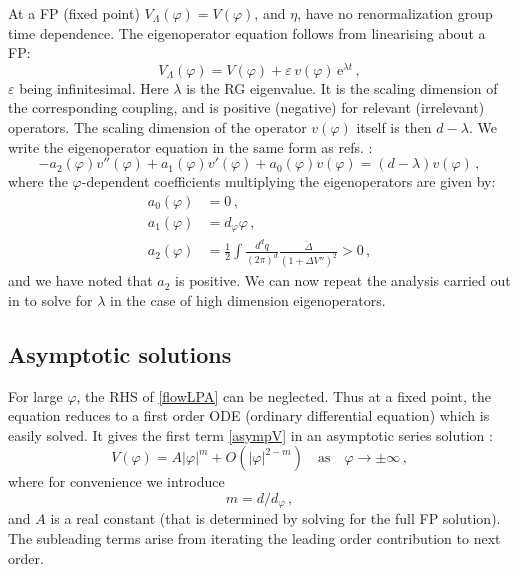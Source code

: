 \documentclass[11pt,a4paper]{article}
\numberwithin{figure}{section}
\numberwithin{equation}{section}
\newcommand{\be}{\begin{equation}}
\newcommand{\ee}{\end{equation}}
\newcommand{\ph}{\varphi}
\newcommand{\e}{\text{e}}
\begin{document}
At a FP (fixed point) $V_\Lambda (\varphi)=V(\varphi)$, and $\eta$, have no renormalization group time dependence. The eigenoperator equation follows from linearising about a FP:
\begin{equation}
    V_\Lambda(\varphi)= V(\ph)+\varepsilon\, v(\ph) \,\e^{\lambda t} \,,
\end{equation}
$\varepsilon$ being infinitesimal. Here $\lambda$ is the RG eigenvalue.  It is the scaling dimension of the corresponding coupling, and is positive (negative) for relevant (irrelevant) operators. The scaling dimension of the operator $v(\ph)$ itself is then $d-\lambda$. We write the eigenoperator equation in the same form as refs. \cite{Benedetti:2013jk,Mitchell:2021qjr,Morris:2022btf}:
\begin{equation}
    -a_2(\ph)v''(\ph)+a_1(\ph)v'(\ph)+a_0(\ph)v(\ph)=(d-\lambda)v(\ph)\,, \label{eig}
\end{equation}
where the $\ph$-dependent coefficients multiplying the eigenoperators are given by: 
\begin{align}
    a_0(\ph) &= 0 \,, \\
    a_1(\ph) &= d_\ph \ph \,,\label{a1} \\
    a_2(\ph) &= \frac12\int \frac{d^d q}{(2\pi)^d}\frac{\dot{\Delta}}{(1+\Delta V'')^2} >0\,, \label{a2}
\end{align}
and we have noted that $a_2$ is positive. 
We can now repeat the analysis carried out in \cite{Benedetti:2013jk,Mitchell:2021qjr,Morris:2022btf} to solve for $\lambda$ in the case of high dimension eigenoperators. 


\subsection{Asymptotic solutions}
For large $\varphi$, the RHS of \eqref{flowLPA} can be neglected. Thus at a fixed point, the equation reduces to a first order ODE (ordinary differential equation) which is easily solved. It gives the first term \eqref{asympV} in an asymptotic series solution \cite{Morris:1994ie}:
\begin{equation}
    V(\varphi)= A |\ph|^{m}+O\left(|\ph|^{2-m}\right) \quad \text{as} \quad \ph \rightarrow \pm \infty \,, \label{sol}
\end{equation}
where for convenience we introduce 
\be m = {d}/{d_\ph}\,, \ee 
and $A$ is a real constant (that is determined by solving for the full FP solution). The subleading terms arise from iterating the leading order contribution to next order.
\end{document}
